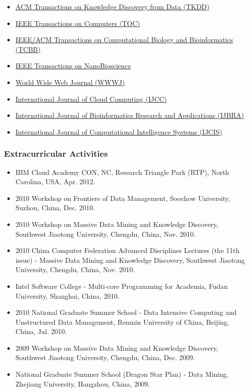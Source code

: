\documentclass[]{article}
\begin{document}
\begin{itemize}
\itemsep1pt\parskip0pt
\item
  \href{http://tkdd.acm.org/}{ACM Transactions on Knowledge Discovery
  from Data (TKDD)}
\item
  \href{http://www.computer.org/portal/web/tc}{IEEE Transactions on
  Computers (TOC)}
\item
  \href{http://www.computer.org/portal/web/tcbb}{IEEE/ACM Transactions
  on Computational Biology and Bioinformatics (TCBB)}
\item
  \href{http://ieeexplore.ieee.org/xpl/RecentIssue.jsp?punumber=7728}{IEEE
  Transactions on NanoBioscience}
\item
  \href{http://www.editorialmanager.com/wwwj/}{World Wide Web Journal
  (WWWJ)}
\item
  \href{http://www.inderscience.com/jhome.php?jcode=ijcc}{International
  Journal of Cloud Computing (IJCC)}
\item
  \href{http://www.inderscience.com/jhome.php?jcode=ijbra}{International
  Journal of Bioinformatics Research and Applications (IJBRA)}
\item
  \href{http://www.atlantis-press.com/publications/ijcis/}{International
  Journal of Computational Intelligence Systems (IJCIS)}
\end{itemize}

\subsubsection{Extracurricular
Activities}\label{extracurricular-activities}

\begin{itemize}
\itemsep1pt\parskip0pt
\item
  IBM Cloud Academy CON, NC, Research Triangle Park (RTP), North
  Carolina, USA, Apr. 2012.
\item
  2010 Workshop on Frontiers of Data Management, Soochow University,
  Suzhou, China, Dec. 2010.
\item
  2010 Workshop on Massive Data Mining and Knowledge Discovery,
  Southwest Jiaotong University, Chengdu, China, Nov. 2010.
\item
  2010 China Computer Federation Advanced Disciplines Lectures (the 11th
  issue) - Massive Data Mining and Knowledge Discovery, Southwest
  Jiaotong University, Chengdu, China, Nov. 2010.
\item
  Intel Software College - Multi-core Programming for Academia, Fudan
  University, Shanghai, China, 2010.
\item
  2010 National Graduate Summer School - Data Intensive Computing and
  Unstructured Data Management, Renmin University of China, Beijing,
  China, Jul. 2010.
\item
  2009 Workshop on Massive Data Mining and Knowledge Discovery,
  Southwest Jiaotong University, Chengdu, China, Dec. 2009.
\item
  National Graduate Summer School (Dragon Star Plan) - Data Mining,
  Zhejiang University, Hangzhou, China, 2009.
\end{itemize}
\end{document}
